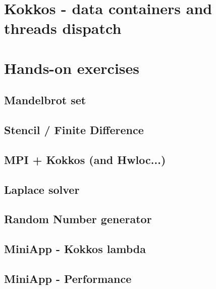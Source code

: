 \documentclass[9pt,hyperref={pdfpagemode=FullScreen,urlcolor=blue},xcolor=x11names]{beamer}
\begin{document}


\section{Kokkos - data containers and threads dispatch}





\section{Hands-on exercises}

\subsection{Mandelbrot set}


\subsection{Stencil / Finite Difference}


\subsection{MPI + Kokkos (and Hwloc...)}


\subsection{Laplace solver}


\subsection{Random Number generator}


\subsection{MiniApp - Kokkos lambda}


\subsection{MiniApp - Performance}

\end{document}
